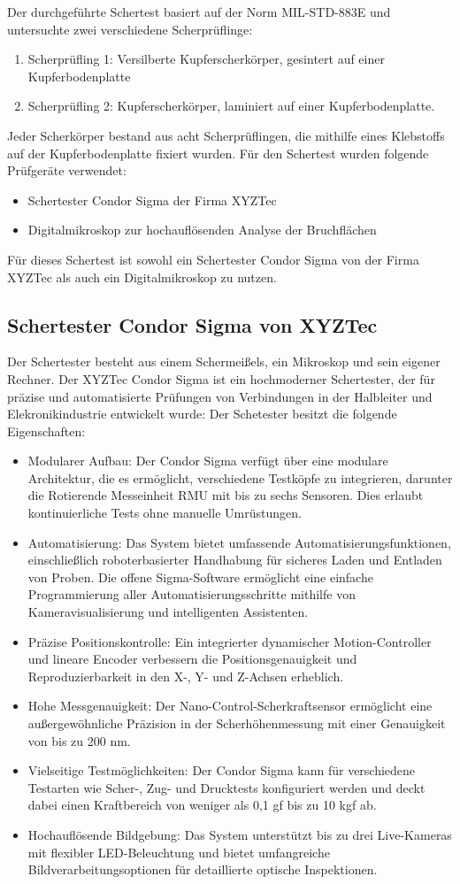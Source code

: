 Der durchgeführte Schertest basiert auf der Norm MIL-STD-883E und untersuchte zwei verschiedene Scherprüflinge:
\begin{enumerate}
    \item Scherprüfling 1: Versilberte Kupferscherkörper, gesintert auf einer Kupferbodenplatte
    \item Scherprüfling 2: Kupferscherkörper, laminiert auf einer Kupferbodenplatte.
\end{enumerate}
Jeder Scherkörper bestand aus acht Scherprüflingen, die mithilfe eines Klebstoffs auf der Kupferbodenplatte fixiert wurden.
Für den Schertest wurden folgende Prüfgeräte verwendet:
\begin{itemize}
    \item Schertester Condor Sigma der Firma XYZTec
    \item Digitalmikroskop zur hochauflösenden Analyse der Bruchflächen
\end{itemize}
Für dieses Schertest ist sowohl ein Schertester Condor Sigma von der Firma XYZTec als auch ein Digitalmikroskop  zu nutzen. 
\subsection{Schertester Condor Sigma von XYZTec}
Der Schertester besteht aus einem Schermeißels, ein Mikroskop und sein eigener Rechner. 
Der XYZTec Condor Sigma ist ein hochmoderner Schertester, der für präzise und automatisierte Prüfungen von Verbindungen in der Halbleiter und Elekronikindustrie entwickelt wurde:
Der Schetester besitzt die folgende Eigenschaften:
\begin{itemize}
    \item Modularer Aufbau: Der Condor Sigma verfügt über eine modulare Architektur, die es ermöglicht, verschiedene Testköpfe zu integrieren, darunter die Rotierende Messeinheit RMU mit bis zu sechs Sensoren. Dies erlaubt kontinuierliche Tests ohne manuelle Umrüstungen. 
    \item Automatisierung: Das System bietet umfassende Automatisierungsfunktionen, einschließlich roboterbasierter Handhabung für sicheres Laden und Entladen von Proben. Die offene Sigma-Software ermöglicht eine einfache Programmierung aller Automatisierungsschritte mithilfe von Kameravisualisierung und intelligenten Assistenten.
    \item Präzise Positionskontrolle: Ein integrierter dynamischer Motion-Controller und lineare Encoder verbessern die Positionsgenauigkeit und Reproduzierbarkeit in den X-, Y- und Z-Achsen erheblich.
    \item Hohe Messgenauigkeit: Der Nano-Control-Scherkraftsensor ermöglicht eine außergewöhnliche Präzision in der Scherhöhenmessung mit einer Genauigkeit von bis zu 200 nm. 
    \item Vielseitige Testmöglichkeiten: Der Condor Sigma kann für verschiedene Testarten wie Scher-, Zug- und Drucktests konfiguriert werden und deckt dabei einen Kraftbereich von weniger als 0,1 gf bis zu 10 kgf ab. 
    \item Hochauflösende Bildgebung: Das System unterstützt bis zu drei Live-Kameras mit flexibler LED-Beleuchtung und bietet umfangreiche Bildverarbeitungsoptionen für detaillierte optische Inspektionen. 
\end{itemize}
